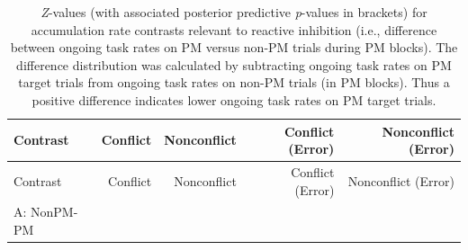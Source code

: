 \documentclass[11pt,]{article}
\begin{document}
\begin{longtable}[]{@{}lrrrr@{}}
\caption{\emph{Z}-values (with associated posterior predictive
\emph{p}-values in brackets) for accumulation rate contrasts relevant to
reactive inhibition (i.e., difference between ongoing task rates on PM
versus non-PM trials during PM blocks). The difference distribution was
calculated by subtracting ongoing task rates on PM target trials from
ongoing task rates on non-PM trials (in PM blocks). Thus a positive
difference indicates lower ongoing task rates on PM target
trials.}\tabularnewline
\toprule
\begin{minipage}[b]{0.13\columnwidth}\raggedright\strut
Contrast\strut
\end{minipage} & \begin{minipage}[b]{0.12\columnwidth}\raggedleft\strut
Conflict\strut
\end{minipage} & \begin{minipage}[b]{0.16\columnwidth}\raggedleft\strut
Nonconflict\strut
\end{minipage} & \begin{minipage}[b]{0.21\columnwidth}\raggedleft\strut
Conflict (Error)\strut
\end{minipage} & \begin{minipage}[b]{0.23\columnwidth}\raggedleft\strut
Nonconflict (Error)\strut
\end{minipage}\tabularnewline
\midrule
\endfirsthead
\toprule
\begin{minipage}[b]{0.13\columnwidth}\raggedright\strut
Contrast\strut
\end{minipage} & \begin{minipage}[b]{0.12\columnwidth}\raggedleft\strut
Conflict\strut
\end{minipage} & \begin{minipage}[b]{0.16\columnwidth}\raggedleft\strut
Nonconflict\strut
\end{minipage} & \begin{minipage}[b]{0.21\columnwidth}\raggedleft\strut
Conflict (Error)\strut
\end{minipage} & \begin{minipage}[b]{0.23\columnwidth}\raggedleft\strut
Nonconflict (Error)\strut
\end{minipage}\tabularnewline
\midrule
\endhead
\begin{minipage}[t]{0.13\columnwidth}\raggedright\strut
A: NonPM-PM\strut
\end{minipage} & \begin{minipage}[t]{0.12\columnwidth}\raggedleft\strut

\end{minipage}
\end{longtable}
\end{document}
